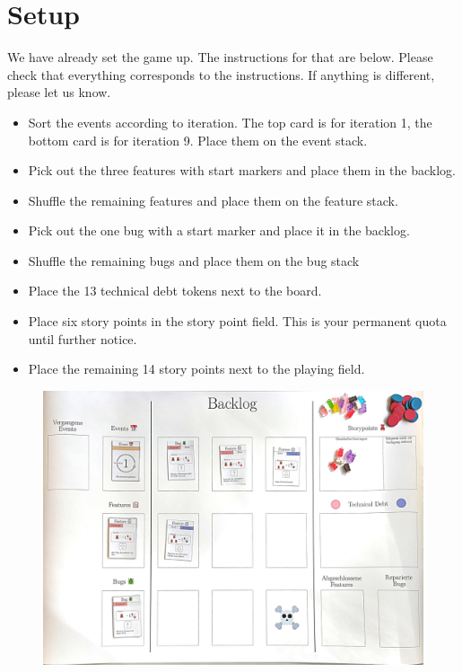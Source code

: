 \documentclass[a4paper, 11pt]{scrartcl}
\begin{document}
\section*{Setup}

\noindent We have already set the game up. The instructions for that are below. Please check that everything corresponds to the instructions. If anything is different, please let us know.

\begin{itemize}
    \item Sort the events according to iteration. The top card is for iteration 1, the bottom card is for iteration 9. Place them on the event stack.
    \item Pick out the three features with start markers and place them in the backlog.
    \item Shuffle the remaining features and place them on the feature stack.
    \item Pick out the one bug with a start marker and place it in the backlog.
    \item Shuffle the remaining bugs and place them on the bug stack
    \item Place the 13 technical debt tokens next to the board.
    \item Place six story points in the story point field. This is your permanent quota until further notice.
    \item Place the remaining 14 story points next to the playing field.
\end{itemize}

\begin{figure}[H]
    \centering
    \includegraphics[width=\textwidth]{images/spielfeld_aufgebaut.jpg}
\end{figure}
\end{document}
